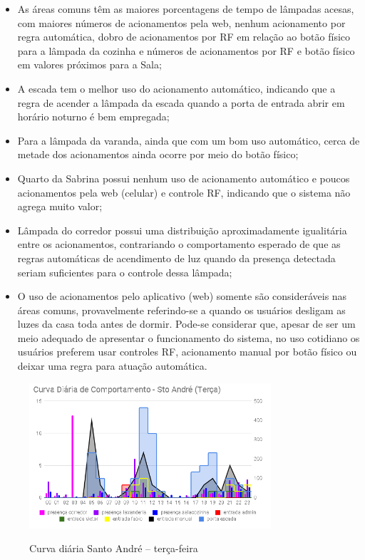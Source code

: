 \begin{itemize}
	\item As áreas comuns têm as maiores porcentagens de tempo de lâmpadas acesas, com maiores números de acionamentos pela web, nenhum acionamento por regra automática, dobro de acionamentos por RF em relação ao botão físico para a lâmpada da cozinha e números de acionamentos por RF e botão físico em valores próximos para a Sala;
	\item A escada tem o melhor uso do acionamento automático, indicando que a regra de acender a lâmpada da escada quando a porta de entrada abrir em horário noturno é bem empregada;
	\item Para a lâmpada da varanda, ainda que com um bom uso automático, cerca de metade dos acionamentos ainda ocorre por meio do botão físico;
	\item Quarto da Sabrina possui nenhum uso de acionamento automático e poucos acionamentos pela web (celular) e controle RF, indicando que o sistema não agrega muito valor;
	\item Lâmpada do corredor possui uma distribuição aproximadamente igualitária entre os acionamentos, contrariando o comportamento esperado de que as regras automáticas de acendimento de luz quando da presença detectada seriam suficientes para o controle dessa lâmpada;
	\item O uso de acionamentos pelo aplicativo (web) somente são consideráveis nas áreas comuns, provavelmente referindo-se a quando os usuários desligam as luzes da casa toda antes de dormir. Pode-se considerar que, apesar de ser um meio adequado de apresentar o funcionamento do sistema, no uso cotidiano os usuários preferem usar controles RF, acionamento manual por botão físico ou deixar uma regra para atuação automática.
\end{itemize}

\begin{figure}[H]
	\centering
	\caption{Curva diária Santo André -- terça-feira}
	\includegraphics[width=0.8\textwidth]{diaStoAndreTerca}
	\label{fig:diaStoAndreTerca}
\end{figure}

